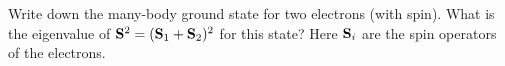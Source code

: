 \newcommand{\ms}{m_s}
\newcommand{\msq}{{\ms}_1}
\newcommand{\msw}{{\ms}_2}
\newcommand{\vxq}{\vx_1}
\newcommand{\vxw}{\vx_2}
\newcommand{\xq}{x_1}
\newcommand{\xw}{x_2}
\newcommand{\yq}{y_1}
\newcommand{\yw}{y_2}
\newcommand{\pxq}{{\px}_1}
\newcommand{\pxw}{{\px}_2}
\newcommand{\pyq}{{\py}_1}
\newcommand{\pyw}{{\py}_2}
\newcommand{\nxq}{{\nx}_1}
\newcommand{\nxw}{{\nx}_2}
\newcommand{\nyq}{{\ny}_1}
\newcommand{\nyw}{{\ny}_2}
\newcommand{\kpsi}{\ket{\psi}}
\newcommand{\kphi}{\ket{\phi}}
\newcommand{\kchi}{\ket{\chi}}
\newcommand{\up}{\uparrow}
\newcommand{\dn}{\downarrow}
\newcommand{\omgA}{\omg_A}
\newcommand{\omgB}{\omg_B}
\newcommand{\Ax}{A_x}
\newcommand{\Ay}{A_y}
\newcommand{\Bx}{B_x}
\newcommand{\By}{B_y}
\newcommand{\fA}{f_{\Ax}}
\newcommand{\gA}{g_{\Ay}}
\newcommand{\fB}{f_{\Bx}}
\newcommand{\gB}{g_{\By}}
\newcommand{\fo}{f_0}
\newcommand{\go}{g_0}
\newcommand{\sq}{s_1}
\newcommand{\sw}{s_2}

\begin{problem}
	Write down the many-body ground state for two electrons (with spin).  What is the eigenvalue of $\vb{S}^2 = (\vb{S}_1 + \vb{S}_2)^2$ for this state?  Here $\vb{S}_i$ are the spin operators of the electrons.
\end{problem}

